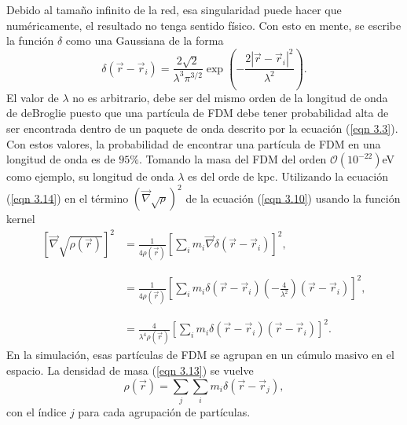 \documentclass[a4paper,openright,12pt]{book}
\begin{document}
Debido al tamaño infinito de la red, esa singularidad puede hacer que numéricamente, el resultado no tenga sentido físico.
Con esto en mente, se escribe la función $\delta$ como una Gaussiana de la forma
\begin{equation}
\delta (\vec{r}-\vec{r}_{i}) = 
\frac{2\sqrt{2}}{\lambda ^{3} \pi ^{3/2}} \exp \left(-\frac{2|\vec{r}-\vec{r}_{i}|^{2}}{\lambda ^{2}}\right).\label{eqn 3.14}
\end{equation}
El valor de $\lambda$ no es arbitrario, debe ser del mismo orden de la longitud de onda de deBroglie puesto que una partícula de FDM debe tener probabilidad alta de ser encontrada dentro de un paquete de onda descrito por la ecuación (\ref{eqn 3.3}). Con estos valores, la probabilidad de encontrar una partícula de FDM en una longitud de onda es de $95 \%$. Tomando la masa del FDM del orden $\mathcal{O}(10^{-22})$eV como ejemplo, su longitud de onda $\lambda$ es del orde de kpc. Utilizando la ecuación (\ref{eqn 3.14}) en el término $(\vec{\nabla}\sqrt{\rho})^{2}$ de la ecuación (\ref{eqn 3.10}) usando la función kernel
\begin{equation}
\begin{array}{ll}
\left[\vec{\nabla}\sqrt{\rho (\vec{r})}\right]^{2} &=
\frac{1}{4\rho(\vec{r})}\left[\sum_{i} m_{i}\vec{\nabla}\delta(\vec{r}-\vec{r}_{i})\right]^{2}, \\\\\\ 
&=
\frac{1}{4\rho(\vec{r})} 
\left[\sum_{i}
m_{i}\delta(\vec{r}-\vec{r}_{i})(-\frac{4}{\lambda^{2}})(\vec{r}-\vec{r}_{i})\right]^{2}, \\\\\\
&=
\frac{4}{\lambda^{4}\rho(\vec{r})}
\left[
\sum_{i} m_{i}\delta(\vec{r}-\vec{r}_{i})(\vec{r}-\vec{r}_{i})
\right]^{2}. \label{eqn 3.15}

\end{array}
\end{equation}
En la simulación, esas partículas de FDM se agrupan en un cúmulo masivo en el espacio. La densidad de masa (\ref{eqn 3.13}) se vuelve
\begin{equation}
\rho(\vec{r})
=
\sum_{j}\sum_{i}m_{i}\delta(\vec{r}-\vec{r}_{j}),\label{eqn 3.16}
\end{equation} 
con el índice $j$ para cada agrupación de partículas. 
\end{document}
